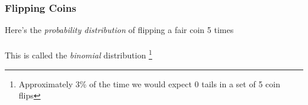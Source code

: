 \documentclass[xcolor=dvipsnames]{beamer}
\newcommand\blfootnote[1]{%
	\begingroup
	\renewcommand\thefootnote{}\footnote{#1}%
	\addtocounter{footnote}{-1}%
	\endgroup
}
\begin{document}
\begin{frame}
		\frametitle{Flipping Coins}
	Here's the \textit{probability distribution} of flipping a fair coin 5 times \\
				
		\\
This is called the \textit{binomial} distribution
\blfootnote{Approximately 3\% of the time we would expect 0 tails in a set of 5 coin flips}
					
					
\end{frame}
\begin{frame}
\end{frame}
\end{document}
